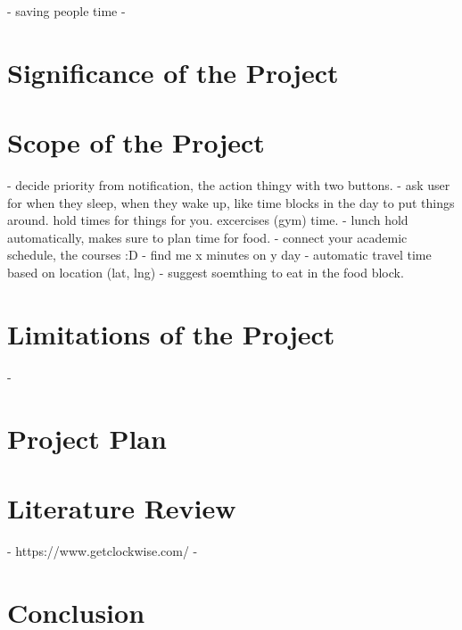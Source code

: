 \documentclass[12pt,a4paper]{article}
\begin{document}
- saving people time
- 

\section{Significance of the Project}

\section{Scope of the Project}

- decide priority from notification, the action thingy with two buttons.
- ask user for when they sleep, when they wake up, like time blocks in the day to put things around. hold times for things for you. excercises (gym) time.
- lunch hold automatically, makes sure to plan time for food.
- connect your academic schedule, the courses :D
- find me x minutes on y day
- automatic travel time based on location (lat, lng)
- suggest soemthing to eat in the food block.

\section{Limitations of the Project}

- 

\section{Project Plan}

\section{Literature Review}

- https://www.getclockwise.com/
- 

\section{Conclusion}

\printbibliography[title=References]
\end{document}
